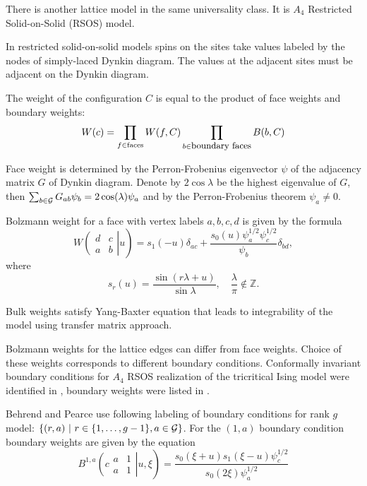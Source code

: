 \documentclass[12pt]{article}
\begin{document}
There is another lattice model in the same universality class. It is $A_4$ Restricted Solid-on-Solid
(RSOS) model. 

In restricted solid-on-solid models spins on the sites take values labeled by the
nodes of simply-laced Dynkin diagram. The values at the adjacent sites must be adjacent on the
Dynkin diagram.

The weight of the configuration $C$ is equal to the product of
face weights and boundary weights:
\begin{equation}
  \label{eq:7}
  W(c)=\prod_{f\in \mathrm{faces}} W(f,C) \prod_{b\in \mbox{\small{boundary
      faces}}} B(b,C)
\end{equation}

Face weight is determined by the Perron-Frobenius
eigenvector $\psi$ of the adjacency matrix $G$ of Dynkin diagram. Denote by $2\cos\lambda$ be the
highest eigenvalue of $G$, then $\sum_{b\in {\cal G}} G_{ab}\psi_b = 2\cos(\lambda) \psi_a $ and 
by the Perron-Frobenius theorem $\psi_a \neq 0$. 

Bolzmann weight for a face with vertex labels $a,b,c,d$ is given by the formula
\begin{equation}
  \label{eq:5}
    W\left.\left(
    \begin{array}{cc}
      d & c\\
      a & b
    \end{array}\right| u \right)
= s_1 (-u)\delta_{ac} + \frac{s_0 (u) \psi_a^{1/2}
  \psi_c^{1/2}}{\psi_b} \delta_{bd},
\end{equation}
where
  \begin{equation}
    \label{eq:6}
    s_r(u)=\frac{\sin(r\lambda+u)}{\sin\lambda},\quad \frac{\lambda}{\pi}\not\in\mathbb{Z}.
  \end{equation}

Bulk weights satisfy Yang-Baxter equation \cite{behrend2001integrable}
that leads to integrability of the model using transfer matrix
approach. 

Bolzmann weights for the lattice edges can differ from face weights.
Choice of these weights corresponds to different boundary conditions.
Conformally invariant boundary conditions for $A_4$ RSOS realization
of the tricritical Ising model were identified in
\cite{chim1996boundary}, boundary weights were listed in
\cite{behrend2001integrable}. 

Behrend and Pearce use following labeling of boundary conditions for
rank $g$ model:
$\left\{(r,a)\ |\ r\in\{1,\dots,g-1\}, a\in {\cal G}\right\}$. For the
$(1,a)$ boundary condition boundary weights are given by the equation
\begin{equation}
  \label{eq:8}
  B^{1,a}\left.\left( c
    \begin{array}{ll}
      a & 1\\
      a & 1
    \end{array}\right| u, \xi \right)= \frac{s_0(\xi+u) s_1(\xi-u)
  \psi^{1/2}_c } {s_0(2\xi) \psi_a^{1/2}}
\end{equation}
\end{document}
